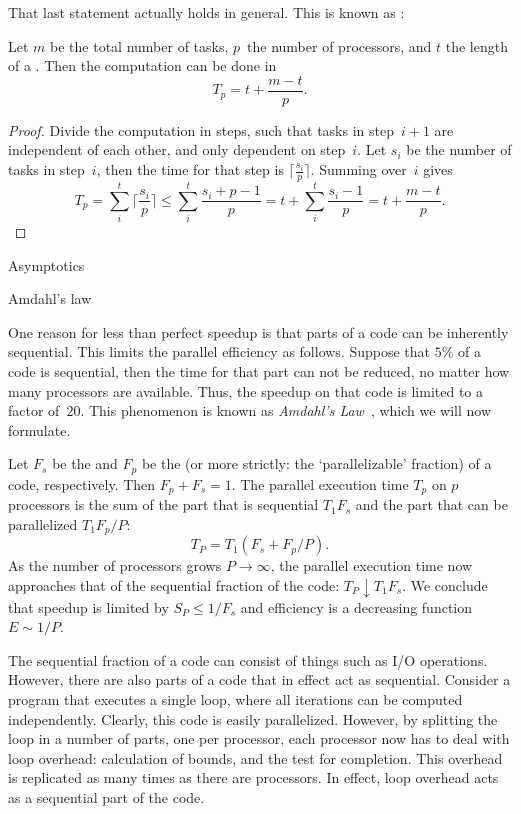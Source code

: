 That last statement actually holds in general. This is known as
:
\begin{theorem}
  Let $m$ be the total number of tasks, $p$~the number of processors,
  and $t$ the length of a . Then
  the computation can be done in \[ T_p = t +\frac{m-t}{p}. \]
\end{theorem}
\begin{proof}
  Divide the computation in steps, such that tasks in step~$i+1$
  are independent of each other, and only dependent on step~$i$.
  Let $s_i$ be the number of tasks in step~$i$, then the time
  for that step is $\lceil \frac{s_i}{p} \rceil$.
  Summing over~$i$ gives
  \[ T_p = \sum_i^t \lceil \frac{s_i}{p} \rceil
  \leq \sum_i^t  \frac{s_i+p-1}{p}  = t + \sum_i^t  \frac{s_i-1}{p}  = t+\frac{m-t}{p}.
  \]
\end{proof}

 {Asymptotics}
\label{sec:asymptotics}


 {Amdahl's law}
\label{sec:amdahl}

One reason for less than perfect speedup is that parts of a code can
be inherently sequential. This limits the parallel efficiency as
follows. Suppose that $5\%$ of a code is sequential, then the time for
that part can not be reduced, no matter how many processors are
available. Thus, the speedup on that code is limited to a factor
of~$20$. This phenomenon is known as \emph{Amdahl's
  Law}~\cite{amd:law}, which we will now formulate.

Let $F_s$ be the
 and
$F_p$ be the  
(or more strictly: the `parallelizable'
fraction) of a code, respectively. Then $F_p+F_s=1$. The parallel
execution time $T_p$ on $p$ processors
is the sum of the part that is sequential
$T_1F_s$ and the part that can be parallelized $T_1F_p/P$:
\begin{equation}
  T_P=T_1(F_s+F_p/P).
  \label{eq:amdahl}
\end{equation}
As the number of processors grows
$P\rightarrow\infty$, the parallel execution time now approaches that
of the sequential fraction of the code: $T_P\downarrow
T_1F_s$. We conclude that speedup is limited by $S_P\leq 1/F_s$ and
efficiency is a decreasing function $E\sim 1/P$.

The sequential fraction of a code can consist of things such as I/O
operations. However, there are also parts of a code that in effect act
as sequential. Consider a program that executes a single loop, where
all iterations can be computed independently. Clearly, this code is
easily parallelized. However, by splitting the loop in a number of
parts, one per processor, each processor now has to deal with loop
overhead: calculation of bounds, and the test for completion. This
overhead is replicated as many times as there are processors. In
effect, loop overhead acts as a sequential part of the code.

